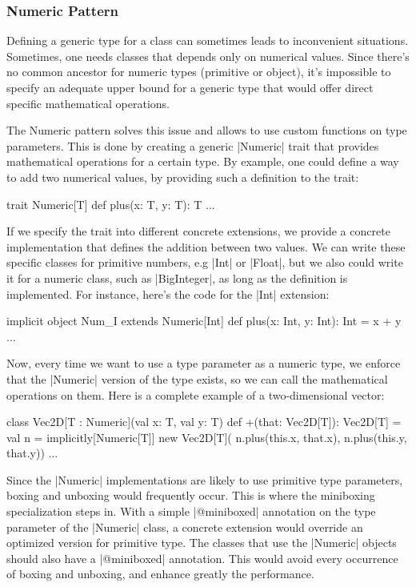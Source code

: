 \subsubsection{Numeric Pattern}

Defining a generic type for a class can sometimes leads to inconvenient situations. Sometimes, one needs classes that depends only on numerical values. Since there's no common ancestor for numeric types (primitive or object), it's impossible to specify an adequate upper bound for a generic type that would offer direct specific mathematical operations.

The Numeric pattern solves this issue and allows to use custom functions on type parameters. This is done by creating a generic |Numeric| trait that provides mathematical operations for a certain type. By example, one could define a way to add two numerical values, by providing such a definition to the trait:

\begin{lstlisting-nobreak}
 trait Numeric[T] {
   def plus(x: T, y: T): T
   ...
 }
\end{lstlisting-nobreak}

If we specify the trait into different concrete extensions, we provide a concrete implementation that defines the addition between two values. We can write these specific classes for primitive numbers, e.g |Int| or |Float|, but we also could write it for a numeric class, such as |BigInteger|, as long as the definition is implemented. For instance, here's the code for the |Int| extension:

\begin{lstlisting-nobreak}
 implicit object Num_I extends Numeric[Int] {
   def plus(x: Int, y: Int): Int = x + y
   ...
 }
\end{lstlisting-nobreak}

Now, every time we want to use a type parameter as a numeric type, we enforce that the |Numeric| version of the type exists, so we can call the mathematical operations on them. Here is a complete example of a two-dimensional vector:

\begin{lstlisting-nobreak}
 class Vec2D[T : Numeric](val x: T, val y: T) {
   def +(that: Vec2D[T]): Vec2D[T] = {
     val n = implicitly[Numeric[T]]
     new Vec2D[T](
       n.plus(this.x, that.x),
       n.plus(this.y, that.y))
   }
   ...
 }
\end{lstlisting-nobreak}

Since the |Numeric| implementations are likely to use primitive type parameters, boxing and unboxing would frequently occur. This is where the miniboxing specialization steps in. With a simple |@miniboxed| annotation on the type parameter of the |Numeric| class, a concrete extension would override an optimized version for primitive type. The classes that use the |Numeric| objects should also have a |@miniboxed| annotation. This would avoid every occurrence of boxing and unboxing, and enhance greatly the performance.